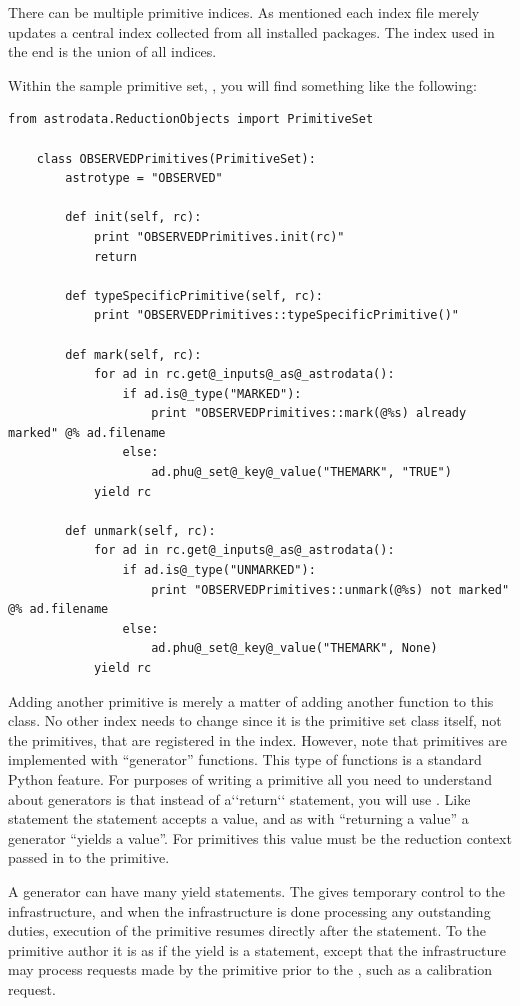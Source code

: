 \documentclass[letterpaper,10pt,english]{sphinxmanual}
\begin{document}
There can be multiple primitive indices. As mentioned each index file
merely updates a central index collected from all installed packages.
The index used in the end is the union of all indices.

Within the sample primitive set, ,
you will find something like the following:

\begin{Verbatim}[commandchars=@\[\]]
from astrodata.ReductionObjects import PrimitiveSet

    class OBSERVEDPrimitives(PrimitiveSet):
        astrotype = "OBSERVED"

        def init(self, rc):
            print "OBSERVEDPrimitives.init(rc)"
            return

        def typeSpecificPrimitive(self, rc):
            print "OBSERVEDPrimitives::typeSpecificPrimitive()"

        def mark(self, rc):
            for ad in rc.get@_inputs@_as@_astrodata():
                if ad.is@_type("MARKED"):
                    print "OBSERVEDPrimitives::mark(@%s) already marked" @% ad.filename
                else:
                    ad.phu@_set@_key@_value("THEMARK", "TRUE")
            yield rc

        def unmark(self, rc):
            for ad in rc.get@_inputs@_as@_astrodata():
                if ad.is@_type("UNMARKED"):
                    print "OBSERVEDPrimitives::unmark(@%s) not marked" @% ad.filename
                else:
                    ad.phu@_set@_key@_value("THEMARK", None)
            yield rc
\end{Verbatim}

Adding another primitive is merely a matter of adding another function to this
class.  No other index needs to change since it is the primitive set class
itself, not the primitives, that are registered in the index. However, note that
primitives are implemented with ``generator'' functions. This type of functions
is a standard Python feature. For purposes of writing a primitive all you need
to understand about generators is that instead of a{}`{}`return{}`{}` statement, you
will use .  Like  statement the  statement accepts a
value, and as with ``returning a value'' a generator ``yields a value''.
For primitives this value
must be the reduction context passed in to the primitive.

A generator can have many yield statements.  The  gives temporary
control to the infrastructure, and when the infrastructure is done processing
any outstanding duties, execution of the primitive resumes directly after the
 statement. To the primitive author it is as if the yield is a 
statement, except that the infrastructure may process requests made by the
primitive prior to the , such as a calibration request.
\end{document}

